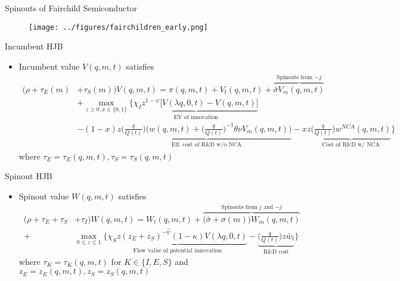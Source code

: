 \documentclass[english,usenames,dvipsnames]{beamer}
\begin{document}
\begin{frame}{Spinouts of Fairchild Semiconductor}\label{fairchildren_early}
\begin{figure}
	\texttt{[image: ../figures/fairchildren\_early.png]}
\end{figure}
\end{frame}



\begin{frame}{Incumbent HJB}\label{HJB_incumbent}
\hyperlink{closing_the_model}{}
\begin{itemize}
\item Incumbent value $V(q,m,t)$ satisfies
\tiny
\begin{align*}
(\rho + \tau_E(m)& + \tau_S(m)) V(q,m,t) = \pi(q,m,t) + V_t(q,m,t) + \overbrace{\bar{\sigma}V_m(q,m,t)}^{\textrm{Spinouts from $-j$}}  \nonumber \\ 
&+ \max_{z \ge 0, x\in \{0,1\}} \Big\{ \underbrace{\chi_I z^{1-\psi} \Big[V(\lambda q,0,t) - V(q,m,t) \Big]}_{\textrm{EV of innovation}} \\
&-(1-x) z \underbrace{\Big(\frac{q}{Q(t)}\Big) \Big(  w(q,m,t) + \Big(\frac{q}{Q(t)}\Big)^{-1} \theta \nu V_m(q,m,t) \Big)}_{\textrm{Eff. cost of R\&D w/o NCA}} - xz \underbrace{\Big( \frac{q}{Q(t)} \Big) w^{NCA}(q,m,t)}_{\textrm{Cost of R\&D w/ NCA}} \Big\} 
\end{align*}
\footnotesize
where $\tau_E = \tau_E(q,m,t),\tau_S = \tau_S(q,m,t)$
\end{itemize}
\end{frame}


\begin{frame}{Spinout HJB}\label{HJB_spinout}
\hyperlink{closing_the_model}{}
\begin{itemize}
\item Spinout value $W(q,m,t)$ satisfies
\scriptsize
\begin{align*}
(\rho  + \tau_E + \tau_S& + \tau_I)W(q,m,t) = W_t(q,m,t) + \overbrace{\big(\bar{\sigma} + \sigma(m) \big)W_m(q,m,t)}^{\textrm{Spinouts from $j$ and $-j$}}\nonumber \\
+& \max_{0 \le z \le 1} \Big\{ \underbrace{\chi_S z (z_E + z_S)^{-\hat{\psi}} (1-\kappa) V(\lambda q,0,t)}_{\textrm{Flow value of potential innovation}} - \underbrace{\Big(\frac{q}{Q(t)}\Big) z \bar{w}_t}_{\textrm{R\&D cost}} \Big\} 
\end{align*}
\footnotesize
where $\tau_K = \tau_K(q,m,t)$ for $K \in \{I,E,S\}$ and $z_E = z_E(q,m,t), z_S = z_S(q,m,t)$
\end{itemize}
\end{frame}
\end{document}
